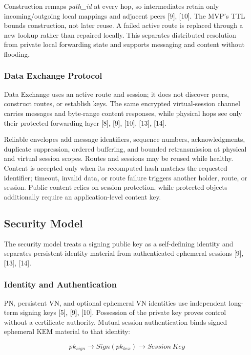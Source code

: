 \documentclass[12pt,a4paper]{article}
\begin{document}
Construction remaps \textit{path\_id} at every hop, so intermediates retain only incoming/outgoing local mappings and adjacent peers [9], [10]. The MVP's TTL bounds construction, not later reuse. A failed active route is replaced through a new lookup rather than repaired locally. This separates distributed resolution from private local forwarding state and supports messaging and content without flooding.

\subsubsection{Data Exchange Protocol}

Data Exchange uses an active route and session; it does not discover peers, construct routes, or establish keys. The same encrypted virtual-session channel carries messages and byte-range content responses, while physical hops see only their protected forwarding layer [8], [9], [10], [13], [14].

Reliable envelopes add message identifiers, sequence numbers, acknowledgments, duplicate suppression, ordered buffering, and bounded retransmission at physical and virtual session scopes. Routes and sessions may be reused while healthy. Content is accepted only when its recomputed hash matches the requested identifier; timeout, invalid data, or route failure triggers another holder, route, or session. Public content relies on session protection, while protected objects additionally require an application-level content key.

\subsection{Security Model}

The security model treats a signing public key as a self-defining identity and separates persistent identity material from authenticated ephemeral sessions [9], [13], [14].

\subsubsection{Identity and Authentication}

PN, persistent VN, and optional ephemeral VN identities use independent long-term signing keys [5], [9], [10]. Possession of the private key proves control without a certificate authority. Mutual session authentication binds signed ephemeral KEM material to that identity:

\[
pk_{sign} \rightarrow Sign(pk_{kex}) \rightarrow Session\ Key
\]
\end{document}

